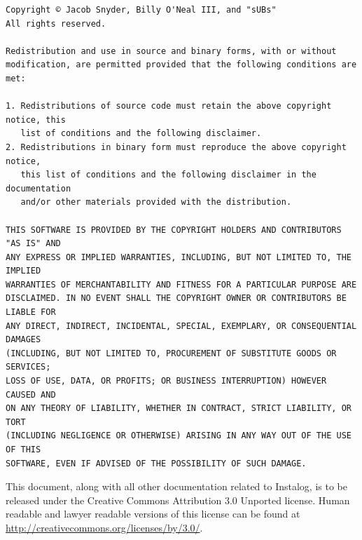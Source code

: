 \documentclass[letterpaper,12pt]{article}
\begin{document}
\begin{verbatim}
Copyright © Jacob Snyder, Billy O'Neal III, and "sUBs"
All rights reserved.

Redistribution and use in source and binary forms, with or without
modification, are permitted provided that the following conditions are met: 

1. Redistributions of source code must retain the above copyright notice, this
   list of conditions and the following disclaimer. 
2. Redistributions in binary form must reproduce the above copyright notice,
   this list of conditions and the following disclaimer in the documentation
   and/or other materials provided with the distribution. 

THIS SOFTWARE IS PROVIDED BY THE COPYRIGHT HOLDERS AND CONTRIBUTORS "AS IS" AND
ANY EXPRESS OR IMPLIED WARRANTIES, INCLUDING, BUT NOT LIMITED TO, THE IMPLIED
WARRANTIES OF MERCHANTABILITY AND FITNESS FOR A PARTICULAR PURPOSE ARE
DISCLAIMED. IN NO EVENT SHALL THE COPYRIGHT OWNER OR CONTRIBUTORS BE LIABLE FOR
ANY DIRECT, INDIRECT, INCIDENTAL, SPECIAL, EXEMPLARY, OR CONSEQUENTIAL DAMAGES
(INCLUDING, BUT NOT LIMITED TO, PROCUREMENT OF SUBSTITUTE GOODS OR SERVICES;
LOSS OF USE, DATA, OR PROFITS; OR BUSINESS INTERRUPTION) HOWEVER CAUSED AND
ON ANY THEORY OF LIABILITY, WHETHER IN CONTRACT, STRICT LIABILITY, OR TORT
(INCLUDING NEGLIGENCE OR OTHERWISE) ARISING IN ANY WAY OUT OF THE USE OF THIS
SOFTWARE, EVEN IF ADVISED OF THE POSSIBILITY OF SUCH DAMAGE.
\end{verbatim}

This document, along with all other documentation related to Instalog,  is to be
released under the Creative Commons Attribution 3.0 Unported license. Human
readable and lawyer readable versions of this license can be found at
\url{http://creativecommons.org/licenses/by/3.0/}.

\newpage
\end{document}
